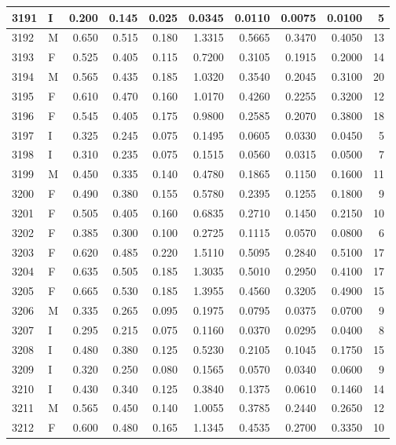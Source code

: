 \documentclass[9pt,twocolumn,twoside,]{pnas-new}
\begin{document}
\begin{tabular}{l|l|r|r|r|r|r|r|r|r}
\hline
3191 & I & 0.200 & 0.145 & 0.025 & 0.0345 & 0.0110 & 0.0075 & 0.0100 & 5\\
\hline
3192 & M & 0.650 & 0.515 & 0.180 & 1.3315 & 0.5665 & 0.3470 & 0.4050 & 13\\
\hline
3193 & F & 0.525 & 0.405 & 0.115 & 0.7200 & 0.3105 & 0.1915 & 0.2000 & 14\\
\hline
3194 & M & 0.565 & 0.435 & 0.185 & 1.0320 & 0.3540 & 0.2045 & 0.3100 & 20\\
\hline
3195 & F & 0.610 & 0.470 & 0.160 & 1.0170 & 0.4260 & 0.2255 & 0.3200 & 12\\
\hline
3196 & F & 0.545 & 0.405 & 0.175 & 0.9800 & 0.2585 & 0.2070 & 0.3800 & 18\\
\hline
3197 & I & 0.325 & 0.245 & 0.075 & 0.1495 & 0.0605 & 0.0330 & 0.0450 & 5\\
\hline
3198 & I & 0.310 & 0.235 & 0.075 & 0.1515 & 0.0560 & 0.0315 & 0.0500 & 7\\
\hline
3199 & M & 0.450 & 0.335 & 0.140 & 0.4780 & 0.1865 & 0.1150 & 0.1600 & 11\\
\hline
3200 & F & 0.490 & 0.380 & 0.155 & 0.5780 & 0.2395 & 0.1255 & 0.1800 & 9\\
\hline
3201 & F & 0.505 & 0.405 & 0.160 & 0.6835 & 0.2710 & 0.1450 & 0.2150 & 10\\
\hline
3202 & F & 0.385 & 0.300 & 0.100 & 0.2725 & 0.1115 & 0.0570 & 0.0800 & 6\\
\hline
3203 & F & 0.620 & 0.485 & 0.220 & 1.5110 & 0.5095 & 0.2840 & 0.5100 & 17\\
\hline
3204 & F & 0.635 & 0.505 & 0.185 & 1.3035 & 0.5010 & 0.2950 & 0.4100 & 17\\
\hline
3205 & F & 0.665 & 0.530 & 0.185 & 1.3955 & 0.4560 & 0.3205 & 0.4900 & 15\\
\hline
3206 & M & 0.335 & 0.265 & 0.095 & 0.1975 & 0.0795 & 0.0375 & 0.0700 & 9\\
\hline
3207 & I & 0.295 & 0.215 & 0.075 & 0.1160 & 0.0370 & 0.0295 & 0.0400 & 8\\
\hline
3208 & I & 0.480 & 0.380 & 0.125 & 0.5230 & 0.2105 & 0.1045 & 0.1750 & 15\\
\hline
3209 & I & 0.320 & 0.250 & 0.080 & 0.1565 & 0.0570 & 0.0340 & 0.0600 & 9\\
\hline
3210 & I & 0.430 & 0.340 & 0.125 & 0.3840 & 0.1375 & 0.0610 & 0.1460 & 14\\
\hline
3211 & M & 0.565 & 0.450 & 0.140 & 1.0055 & 0.3785 & 0.2440 & 0.2650 & 12\\
\hline
3212 & F & 0.600 & 0.480 & 0.165 & 1.1345 & 0.4535 & 0.2700 & 0.3350 & 10\\

\end{tabular}
\end{document}
